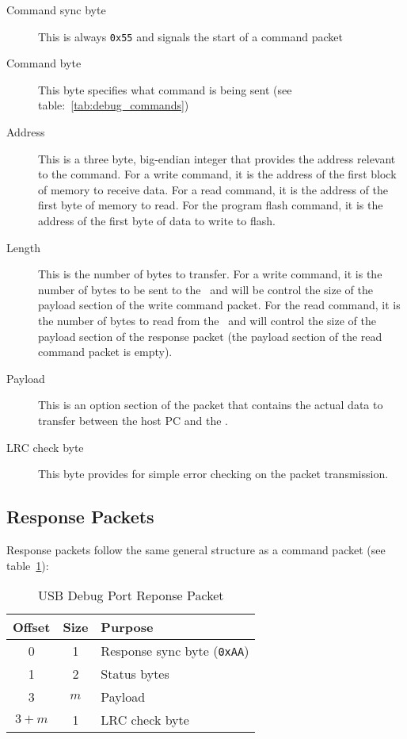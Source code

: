 \begin{description}
    \item[Command sync byte] This is always \verb+0x55+ and signals the start of a command packet

    \item[Command byte] This byte specifies what command is being sent (see table:~\ref{tab:debug_commands})

    \item[Address] This is a three byte, big-endian integer that provides the address relevant to the command. For a write command, it is the address of the first block of memory to receive data. For a read command, it is the address of the first byte of memory to read. For the program flash command, it is the address of the first byte of data to write to flash.

    \item[Length] This is the number of bytes to transfer. For a write command, it is the number of bytes to be sent to the \jr\ and will be control the size of the payload section of the write command packet. For the read command, it is the number of bytes to read from the \jr\ and will control the size of the payload section of the response packet (the payload section of the read command packet is empty).

    \item[Payload] This is an option section of the packet that contains the actual data to transfer between the host PC and the \jr.

    \item[LRC check byte] This byte provides for simple error checking on the packet transmission.
\end{description}

\subsection*{Response Packets}

Response packets follow the same general structure as a command packet (see table~\ref{tab:debug_resp_packet}):

\begin{table}[ht]
    \begin{center}
        \begin{tabular}{|c|c|l|} \hline
            Offset & Size & Purpose \\ \hline\hline
            0 & 1 & Response sync byte (\verb+0xAA+)\\ \hline
            1 & 2 & Status bytes \\ \hline
            3 & $m$ & Payload \\ \hline
            $3 + m$ & 1 & LRC check byte \\ \hline
        \end{tabular}
    \end{center}
    \caption{USB Debug Port Reponse Packet}
    \label{tab:debug_resp_packet}
\end{table}

